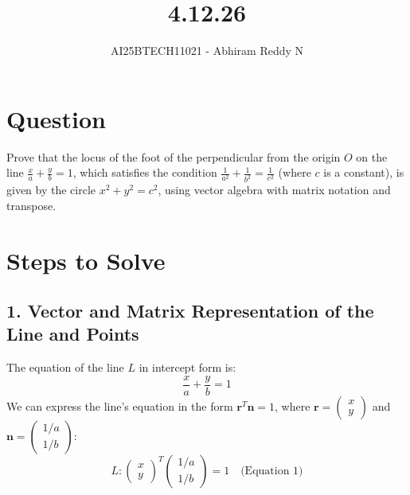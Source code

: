 \documentclass[journal]{IEEEtran}
\begin{document}

\vspace{3cm}

\title{4.12.26}
\author{AI25BTECH11021 - Abhiram Reddy N}
{\let\newpage\relax\maketitle}

\renewcommand{\thefigure}{\theenumi}
\renewcommand{\thetable}{\theenumi}
\setlength{\intextsep}{10pt} %


\renewcommand{\thetable}{\theenumi}


\section*{Question}

Prove that the locus of the foot of the perpendicular from the origin $O$ on the line $\frac{x}{a} + \frac{y}{b} = 1$, which satisfies the condition $\frac{1}{a^2} + \frac{1}{b^2} = \frac{1}{c^2}$ (where $c$ is a constant), is given by the circle $x^2 + y^2 = c^2$, using vector algebra with matrix notation and transpose.


\section*{Steps to Solve}

\subsection*{1. Vector and Matrix Representation of the Line and Points}

The equation of the line $L$ in intercept form is:
$$\frac{x}{a} + \frac{y}{b} = 1$$
We can express the line's equation in the form $\mathbf{r}^T \mathbf{n} = 1$, where $\mathbf{r} = \begin{pmatrix} x \\ y \end{pmatrix}$ and $\mathbf{n} = \begin{pmatrix} 1/a \\ 1/b \end{pmatrix}$:
$$L: \begin{pmatrix} x \\ y \end{pmatrix}^T \begin{pmatrix} 1/a \\ 1/b \end{pmatrix} = 1 \quad \text{(Equation 1)}$$
\end{document}
